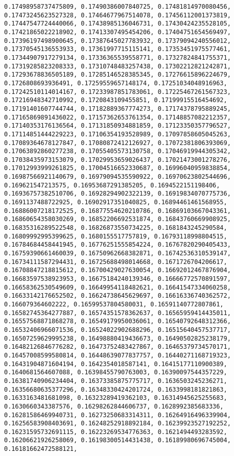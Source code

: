 \documentclass[11pt]{article}
\begin{document}
\begin{Verbatim}[commandchars=\\\{\}]
0.17498958737475809, 0.17490386007840725, 0.17481814970080456, 0.17473245623527328, 0.17464677967514078, 0.17456112001373819, 0.17447547724440066, 0.17438985136046731, 0.17430424235528105, 0.17421865022218902, 0.17413307495454206, 0.17404751654569497, 0.17396197498900645, 0.17387645027783932, 0.17379094240556012, 0.17370545136553933, 0.17361997715115141, 0.17353451975577461, 0.17344907917279134, 0.17336365539558771, 0.17327824841755371, 0.17319285823208333, 0.17310748483257438, 0.17302212821242871, 0.17293678836505189, 0.17285146528385345, 0.17276615896224679, 0.1726808693936491, 0.17259559657148174, 0.17251034048916963, 0.17242510114014167, 0.17233987851783061, 0.17225467261567323, 0.17216948342710992, 0.1720843109455851, 0.17199915516454692, 0.17191401607744744, 0.17182889367774273, 0.17174378795889245, 0.17165869891436022, 0.17157362653761354, 0.17148857082212357, 0.17140353176136564, 0.17131850934881859, 0.17123350357796527, 0.17114851444229223, 0.17106354193528989, 0.17097858605045263, 0.17089364678127847, 0.17080872412126927, 0.17072381806393069, 0.17063892860277238, 0.17055405573130758, 0.17046919944305342, 0.17038435973153079, 0.17029953659026437, 0.17021473001278276, 0.17012993999261825, 0.17004516652330687, 0.16996040959838854, 0.16987566921140679, 0.16979094535590922, 0.16970623802544696, 0.169621547213575, 0.16953687291385205, 0.1694522151198406, 0.16936757382510706, 0.16928294902322139, 0.16919834070775736, 0.1691137488722925, 0.16902917351040825, 0.16894461461568955, 0.16886007218172525, 0.16877554620210786, 0.16869103667043361, 0.16860654358030269, 0.16852206692531874, 0.16843760669908925, 0.16835316289522548, 0.16826873550734225, 0.1681843245290584, 0.16809992995399625, 0.1680155517757819, 0.16793118998804515, 0.16784684458441945, 0.16776251555854224, 0.16767820290405433, 0.16759390661460039, 0.16750962668382871, 0.16742536310539147, 0.16734111587294431, 0.16725688498014668, 0.1671726704206617, 0.16708847218815612, 0.16700429027630054, 0.16692012467876904, 0.16683597538923953, 0.16675184240139346, 0.16666772570891597, 0.16658362530549609, 0.16649954118482621, 0.16641547334060258, 0.16633142176652502, 0.16624738645629697, 0.16616336740362572, 0.166079364602222, 0.16599537804580031, 0.16591140772807861, 0.16582745364277887, 0.16574351578362637, 0.16565959414435011, 0.16557568871868278, 0.16549179950036061, 0.16540792648312366, 0.16532406966071536, 0.16524022902688296, 0.16515640457537717, 0.16507259629995238, 0.16498880419436673, 0.16490502825238179, 0.16482126846776282, 0.16473752483427867, 0.16465379734570171, 0.16457008599580814, 0.16448639077837757, 0.16440271168719323, 0.16431904871604194, 0.1642354018587141, 0.16415177110900389, 0.1640681564607088, 0.16398455790763003, 0.16390097544357229, 0.16381740906234404, 0.16373385875775717, 0.1636503245236271, 0.16356680635377296, 0.16348330424201724, 0.1633998181821863, 0.1633163481681098, 0.16323289419362103, 0.16314945625255683, 0.1630660343387576, 0.16298262844606737, 0.1628992385683336, 0.16281586469940731, 0.16273250683314311, 0.16264916496339904, 0.16256583908403691, 0.16248252918892184, 0.16239923527192252, 0.16231595732691115, 0.16223269534776363, 0.1621494493283592, 0.16206621926258069, 0.16198300514431438, 0.16189980696745004, 0.16181662472588121, 
\end{Verbatim}
\end{document}
